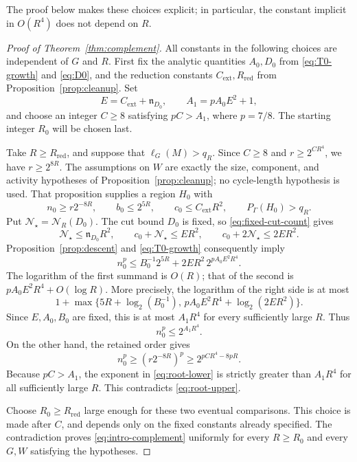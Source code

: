 \documentclass[11pt,a4paper]{article}
\numberwithin{equation}{section}
\theoremstyle{definition}
\theoremstyle{remark}
\begin{document}
The proof below makes these choices explicit; in particular, the constant implicit in $O(R^4)$ does not depend on $R$.

\begin{proof}[Proof of Theorem~\ref{thm:complement}]
All constants in the following choices are independent of $G$ and $R$. First fix the analytic quantities $A_0,D_0$ from \eqref{eq:T0-growth} and \eqref{eq:D0}, and the reduction constants $C_{\mathrm{ext}},R_{\mathrm{red}}$ from Proposition~\ref{prop:cleanup}. Set
\begin{equation}\label{eq:global-constants}
 E=C_{\mathrm{ext}}+\mathfrak n_{D_0},\qquad
 A_1=pA_0E^2+1,
\end{equation}
and choose an integer $C\ge8$ satisfying $pC>A_1$, where $p=7/8$. The starting integer $R_0$ will be chosen last.

Take $R\ge R_{\mathrm{red}}$, and suppose that $\ell_G(M)>q_R$. Since $C\ge8$ and $r\ge2^{CR^4}$, we have $r\ge2^{8R}$. The assumptions on $W$ are exactly the size, component, and activity hypotheses of Proposition~\ref{prop:cleanup}; no cycle-length hypothesis is used. That proposition supplies a region $H_0$ with
\[
 n_0\ge r2^{-8R},\qquad b_0\le2^{5R},\qquad
 c_0\le C_{\mathrm{ext}}R^2,\qquad P_\Gamma(H_0)>q_R.
\]
Put $\mathcal N_\star=\mathcal N_R(D_0)$. The cut bound $D_0$ is fixed, so \eqref{eq:fixed-cut-count} gives
\[
 \mathcal N_\star\le \mathfrak n_{D_0}R^2,\qquad
 c_0+\mathcal N_\star\le ER^2,\qquad c_0+2\mathcal N_\star\le2ER^2.
\]
Proposition~\ref{prop:descent} and \eqref{eq:T0-growth} consequently imply
\begin{equation}\label{eq:root-upper-raw}
 n_0^p
 \le B_0^{-1}2^{5R}
       +2ER^2\,2^{pA_0E^2R^4}.
\end{equation}
The logarithm of the first summand is $O(R)$; that of the second is
$pA_0E^2R^4+O(\log R)$. More precisely, the logarithm of the right side is at most
\[
 1+\max\{5R+\log_2(B_0^{-1}),\,
          pA_0E^2R^4+\log_2(2ER^2)\}.
\]
Since $E,A_0,B_0$ are fixed, this is at most $A_1R^4$ for every sufficiently large $R$. Thus
\begin{equation}\label{eq:root-upper}
 n_0^p\le2^{A_1R^4}.
\end{equation}
On the other hand, the retained order gives
\begin{equation}\label{eq:root-lower}
 n_0^p\ge(r2^{-8R})^p\ge2^{pCR^4-8pR}.
\end{equation}
Because $pC>A_1$, the exponent in \eqref{eq:root-lower} is strictly greater than $A_1R^4$ for all sufficiently large $R$. This contradicts \eqref{eq:root-upper}.

Choose $R_0\ge R_{\mathrm{red}}$ large enough for these two eventual comparisons. This choice is made after $C$, and depends only on the fixed constants already specified. The contradiction proves \eqref{eq:intro-complement} uniformly for every $R\ge R_0$ and every $G,W$ satisfying the hypotheses.
\end{proof}
\end{document}
